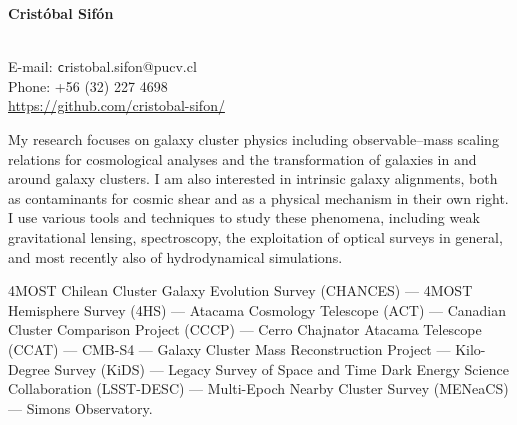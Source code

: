 \documentclass[11pt]{article}
\begin{document}
\begin{minipage}[b]{0.46\linewidth}
\flushleft
\hspace{-0.7cm}
{\bf\huge Crist\'obal Sif\'on}\\\vspace{0.2cm}
\\
\end{minipage}
\begin{minipage}[b]{0.49\linewidth}
\flushright
{\large E-mail: {\texttt cristobal.sifon@pucv.cl}\\
        Phone: +56 (32) 227 4698\\
        \url{https://github.com/cristobal-sifon/}}
\end{minipage}
\vspace{0.4cm}
\hline




My research focuses on galaxy cluster physics including observable--mass scaling relations for cosmological analyses and the transformation of galaxies in and around galaxy clusters. I am also interested in intrinsic galaxy alignments, both as contaminants for cosmic shear and as a physical mechanism in their own right. I use various tools and techniques to study these phenomena, including weak gravitational lensing, spectroscopy, the exploitation of optical surveys in general, and most recently also of hydrodynamical simulations.

\vspace{0.5cm}
{
 4MOST Chilean Cluster Galaxy Evolution Survey (CHANCES) ---
 4MOST Hemisphere Survey (4HS) ---
 Atacama Cosmology Telescope (ACT) ---
 Canadian Cluster Comparison Project (CCCP) ---
 Cerro Chajnator Atacama Telescope (CCAT) ---
 CMB-S4 ---
 Galaxy Cluster Mass Reconstruction Project ---
 Kilo-Degree Survey (KiDS) ---
 Legacy Survey of Space and Time Dark Energy Science Collaboration (LSST-DESC) ---
 Multi-Epoch Nearby Cluster Survey (MENeaCS) ---
 Simons Observatory.
}
\end{document}
